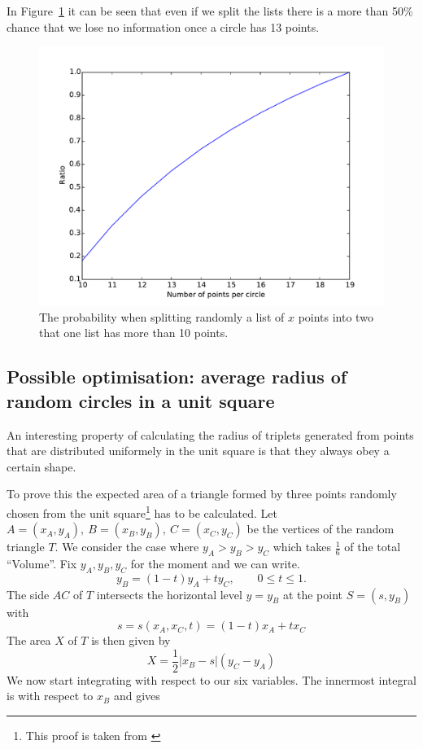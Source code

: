 \documentclass[11pt,twoside]{scrreprt}
\begin{document}
In Figure~\ref{fig:ratios} it can be seen that even if we split the lists there is a more 
than 50\% chance that we lose no information once a circle has 13 points.
\begin{figure}[htb]
  \centering
  \includegraphics[width=\textwidth]{pics/ratio.pdf}
  \caption{The probability when splitting randomly a list of $x$ points into two that one list has more than 10 points.}
  \label{fig:ratios}
\end{figure}


\subsection{Possible optimisation: average radius of random circles in a unit square} %
\label{ssub:average_radius_of_random_circles_in_a_unit_square}
An interesting property of calculating the radius of triplets generated from points that are distributed uniformely in the unit square is 
that they always obey a certain shape.

To prove this the expected area of a triangle formed by three points randomly chosen from the unit square\footnote{This proof is taken
from \cite{Blatter:2015}} has to be calculated. Let \( A = (x_A, y_A),\ B = (x_B, y_B),\ C = (x_C, y_C)\) be the vertices of the random triangle \( T \). We consider the case where \( y_A
> y_B > y_C \) which takes $\frac{1}{6}$ of the total ``Volume''. Fix \( y_A, y_B, y_C \) for the moment and we can write.
\[
  y_B = (1-t)y_A + ty_C, \qquad 0 \leq t \leq 1.
\]
The side $AC$ of $T$ intersects the horizontal level $y=y_B$ at the point $S=(s,y_B)$ with
\begin{equation}
  s = s(x_A,x_C,t) = (1-t)x_A + tx_C
\end{equation}
The area $X$ of $T$ is then given by
\[
  X = \frac{1}{2}\lvert x_B - s\rvert(y_C - y_A)
\]
We now start integrating with respect to our six variables. The innermost integral is with respect to $x_B$ and gives
\end{document}
